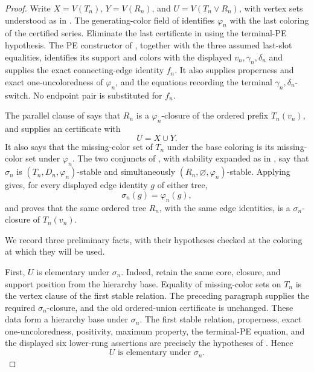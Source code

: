 \begin{proof}
Write $X=V(T_n)$, $Y=V(R_n)$, and
$U=V(T_n\vee R_n)$, with vertex sets understood as in
.  The generating-color field of
 identifies $\varphi_n$ with the last
coloring of the certified series.  Eliminate the last certificate in
 using the terminal-PE hypothesis.  The PE
constructor of , together with the three
assumed last-slot equalities, identifies its support and colors with the
displayed $v_n,\gamma_n,\delta_n$ and supplies the exact connecting-edge
identity $f_n$.  It also supplies properness and exact
one-uncoloredness of $\varphi_n$, and the equations recording the
terminal $\gamma_n,\delta_n$-switch.  No endpoint pair is substituted
for $f_n$.

The parallel clause of  says that $R_n$ is a
$\varphi_n$-closure of the ordered prefix $T_n(v_n)$, and supplies
an  certificate with
\[
                         U=X\cup Y.                       \tag{1}
\]
It also says that the missing-color set of $T_n$ under the base
coloring is its missing-color set under $\varphi_n$.
The two conjuncts of , with stability
expanded as in , say that
$\sigma_n$ is $(T_n,D_n,\varphi_n)$-stable and simultaneously
$(R_n,\varnothing,\varphi_n)$-stable.  Applying
 gives, for every displayed edge
identity $g$ of either tree,
\[
             \sigma_n(g)=\varphi_n(g),                    \tag{2}
\]
and proves that the same ordered tree $R_n$, with the same edge
identities, is a $\sigma_n$-closure of $T_n(v_n)$.

We record three preliminary facts, with their hypotheses checked at the
coloring at which they will be used.

First, $U$ is elementary under $\sigma_n$.  Indeed, retain the same
core, closure, and support position from the hierarchy base.  Equality
of missing-color sets on $T_n$ is the vertex clause of the first stable
relation.  The preceding paragraph supplies the required
$\sigma_n$-closure, and the old ordered-union certificate is unchanged.
These data form a hierarchy base under $\sigma_n$.  The first stable
relation, properness, exact one-uncoloredness, positivity, maximum
property, the terminal-PE equation, and the displayed six lower-rung
assertions are precisely the hypotheses of
.  Hence
\[
                  U\text{ is elementary under }\sigma_n.   \tag{3}
\]


\end{proof}
